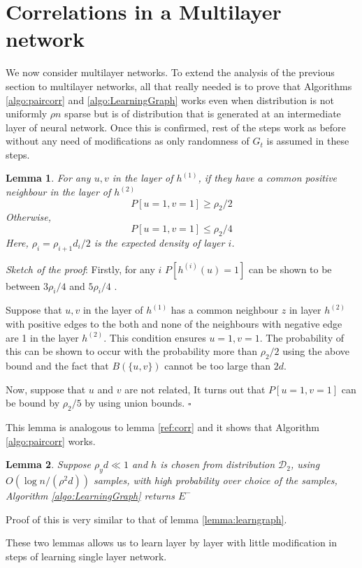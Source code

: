 \documentclass[11pt]{article}
\newtheorem{lemma}{Lemma}
\begin{document}
	\section{Correlations in a Multilayer network}
	We now consider multilayer networks. To extend the analysis of the previous section to multilayer networks, all that really needed is to prove that Algorithms \ref{algo:paircorr} and \ref{algo:LearningGraph} works even when distribution is not uniformly $\rho n$ sparse but is of distribution that is generated at an intermediate layer of neural network. Once this is confirmed, rest of the steps work as before without any need of modifications as only randomness of $G_t$ is assumed in these steps.
	
	\begin{lemma}
	For any $u,v$ in the layer of $h^{(1)}$, if they have a common positive neighbour in the layer of $h^{(2)}$
	\[P[u = 1, v = 1] \geq \rho_{2}/2\] Otherwise,
	\[P[u = 1, v = 1] \leq \rho_{2}/4\] 
	Here, $\rho_i = \rho_{i+1}d_i/2$ is the expected density of layer $i$.
	\end{lemma}
	\emph{Sketch of the proof}: Firstly, for any $i$ $P[h^{(i)}(u) = 1]$ can be shown to be between $3\rho_i/4$ and $5\rho_i/4$ . 
	
	Suppose that  $u,v$ in the layer of $h^{(1)}$ has a common neighbour $z$ in layer $h^{(2)}$ with positive edges to the both and none of the neighbours with negative edge are 1 in the layer $h^{(2)}$. This condition ensures $u = 1, v = 1$. The probability of this can be shown to occur with the probability more than $\rho_2/2$ using the above bound and the fact that $B(\{u,v\})$ cannot be too large than $2d$.
	
	Now, suppose that $u$ and $v$ are not related, It turns out that $P[u = 1, v = 1]$ can be bound by $\rho_{2}/5$ by using union bounds. $\square$
	
	This lemma is analogous to lemma \ref{ref:corr} and it shows that Algorithm \ref{algo:paircorr} works.
	
	\begin{lemma}
	Suppose $\rho_y d \ll 1$ and $h$ is chosen from distribution $\mathcal{D}_2$, using $O(\log n/(\rho^2 d))$ samples, with high probability over choice of the samples, Algorithm \ref{algo:LearningGraph} returns $E^-$
	\end{lemma}
	Proof of this is very similar to that of lemma \ref{lemma:learngraph}.
	
	These two lemmas allows us to learn layer by layer with little modification in steps of learning single layer network.
	
\end{document}
